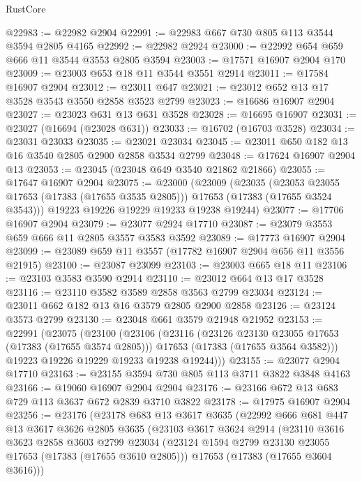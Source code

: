 \begin{lexlean}{RustCore}
\begin{coremodule}
@22983 := @22982 @2904
@22991 := @22983 @667 @730 @805 @113 @3544 @3594 @2805 @4165
@22992 := @22982 @2924
@23000 := @22992 @654 @659 @666 @11 @3544 @3553 @2805 @3594
@23003 := @17571 @16907 @2904 @170
@23009 := @23003 @653 @18 @11 @3544 @3551 @2914
@23011 := @17584 @16907 @2904
@23012 := @23011 @647
@23021 := @23012 @652 @13 @17 @3528 @3543 @3550 @2858 @3523 @2799
@23023 := @16686 @16907 @2904
@23027 := @23023 @631 @13 @631 @3528
@23028 := @16695 @16907
@23031 := @23027 (@16694 (@23028 @631))
@23033 := @16702 (@16703 @3528)
@23034 := @23031 @23033
@23035 := @23021 @23034
@23045 := @23011 @650 @182 @13 @16 @3540 @2805 @2900 @2858 @3534 @2799
@23048 := @17624 @16907 @2904 @13
@23053 := @23045 (@23048 @649 @3540 @21862 @21866)
@23055 := @17647 @16907 @2904
@23075 := @23000
    (@23009
      (@23035
        (@23053 @23055 @17653 (@17383 (@17655 @3535 @2805)))
        @17653
        (@17383 (@17655 @3524 @3543)))
      @19223
      @19226
      @19229
      @19233
      @19238
      @19244)
@23077 := @17706 @16907 @2904
@23079 := @23077 @2924 @17710
@23087 := @23079 @3553 @659 @666 @11 @2805 @3557 @3583 @3592
@23089 := @17773 @16907 @2904
@23099 := @23089 @659 @11 @3557 (@17782 @16907 @2904 @656 @11 @3556 @21915)
@23100 := @23087 @23099
@23103 := @23003 @665 @18 @11
@23106 := @23103 @3583 @3590 @2914
@23110 := @23012 @664 @13 @17 @3528
@23116 := @23110 @3582 @3589 @2858 @3563 @2799 @23034
@23124 := @23011 @662 @182 @13 @16 @3579 @2805 @2900 @2858
@23126 := @23124 @3573 @2799
@23130 := @23048 @661 @3579 @21948 @21952
@23153 := @22991
    (@23075
      (@23100
        (@23106
          (@23116
            (@23126 @23130 @23055 @17653 (@17383 (@17655 @3574 @2805)))
            @17653
            (@17383 (@17655 @3564 @3582)))
          @19223
          @19226
          @19229
          @19233
          @19238
          @19244)))
@23155 := @23077 @2904 @17710
@23163 := @23155 @3594 @730 @805 @113 @3711 @3822 @3848 @4163
@23166 := @19060 @16907 @2904 @2904
@23176 := @23166 @672 @13 @683 @729 @113 @3637 @672 @2839 @3710 @3822
@23178 := @17975 @16907 @2904
@23256 := @23176
    (@23178
      @683
      @13
      @3617
      @3635
      (@22992
        @666
        @681
        @447
        @13
        @3617
        @3626
        @2805
        @3635
        (@23103
          @3617
          @3624
          @2914
          (@23110
            @3616
            @3623
            @2858
            @3603
            @2799
            @23034
            (@23124 @1594 @2799 @23130 @23055 @17653 (@17383 (@17655 @3610 @2805)))
            @17653
            (@17383 (@17655 @3604 @3616)))

\end{coremodule}
\end{lexlean}
